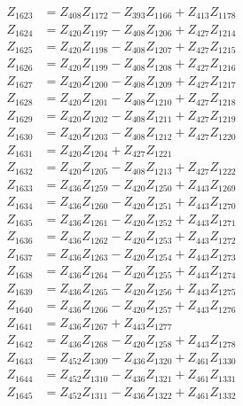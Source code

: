 \begin{multicols}{2}
\begin{align}
Z_{1623} &= Z_{408}Z_{1172} - Z_{393}Z_{1166} + Z_{413}Z_{1178} \nonumber \\
Z_{1624} &= Z_{420}Z_{1197} - Z_{408}Z_{1206} + Z_{427}Z_{1214} \nonumber \\
Z_{1625} &= Z_{420}Z_{1198} - Z_{408}Z_{1207} + Z_{427}Z_{1215} \nonumber \\
Z_{1626} &= Z_{420}Z_{1199} - Z_{408}Z_{1208} + Z_{427}Z_{1216} \nonumber \\
Z_{1627} &= Z_{420}Z_{1200} - Z_{408}Z_{1209} + Z_{427}Z_{1217} \nonumber \\
Z_{1628} &= Z_{420}Z_{1201} - Z_{408}Z_{1210} + Z_{427}Z_{1218} \nonumber \\
Z_{1629} &= Z_{420}Z_{1202} - Z_{408}Z_{1211} + Z_{427}Z_{1219} \nonumber \\
Z_{1630} &= Z_{420}Z_{1203} - Z_{408}Z_{1212} + Z_{427}Z_{1220} \nonumber \\
Z_{1631} &= Z_{420}Z_{1204} + Z_{427}Z_{1221} \nonumber \\
Z_{1632} &= Z_{420}Z_{1205} - Z_{408}Z_{1213} + Z_{427}Z_{1222} \nonumber \\
Z_{1633} &= Z_{436}Z_{1259} - Z_{420}Z_{1250} + Z_{443}Z_{1269} \nonumber \\
Z_{1634} &= Z_{436}Z_{1260} - Z_{420}Z_{1251} + Z_{443}Z_{1270} \nonumber \\
Z_{1635} &= Z_{436}Z_{1261} - Z_{420}Z_{1252} + Z_{443}Z_{1271} \nonumber \\
Z_{1636} &= Z_{436}Z_{1262} - Z_{420}Z_{1253} + Z_{443}Z_{1272} \nonumber \\
Z_{1637} &= Z_{436}Z_{1263} - Z_{420}Z_{1254} + Z_{443}Z_{1273} \nonumber \\
Z_{1638} &= Z_{436}Z_{1264} - Z_{420}Z_{1255} + Z_{443}Z_{1274} \nonumber \\
Z_{1639} &= Z_{436}Z_{1265} - Z_{420}Z_{1256} + Z_{443}Z_{1275} \nonumber \\
Z_{1640} &= Z_{436}Z_{1266} - Z_{420}Z_{1257} + Z_{443}Z_{1276} \nonumber \\
Z_{1641} &= Z_{436}Z_{1267} + Z_{443}Z_{1277} \nonumber \\
Z_{1642} &= Z_{436}Z_{1268} - Z_{420}Z_{1258} + Z_{443}Z_{1278} \nonumber \\
Z_{1643} &= Z_{452}Z_{1309} - Z_{436}Z_{1320} + Z_{461}Z_{1330} \nonumber \\
Z_{1644} &= Z_{452}Z_{1310} - Z_{436}Z_{1321} + Z_{461}Z_{1331} \nonumber \\
Z_{1645} &= Z_{452}Z_{1311} - Z_{436}Z_{1322} + Z_{461}Z_{1332} \nonumber \\

\end{align}
\end{multicols}
